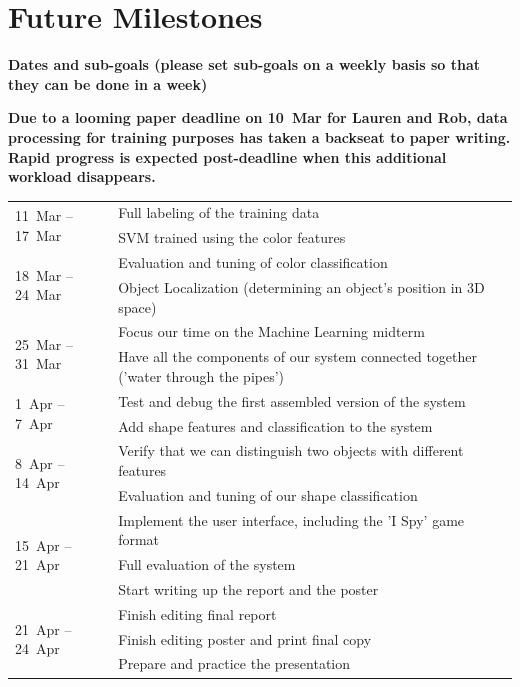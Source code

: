 \documentclass[11pt]{article}
\newcommand{\xxx}[1]{{\bf \color{red} #1}}
\newcommand{\meh}[1]{{\bf \color{blue} #1}}
\newcommand\T{\rule{0pt}{3ex}}
\newcommand\B{\rule[-1.2ex]{0pt}{0pt}}
\begin{document}
\section{Future Milestones}
\xxx{Dates and sub-goals (please set sub-goals on a weekly basis so that they
    can be done in a week)}

\meh{Due to a looming paper deadline on 10~Mar for Lauren and Rob, data
    processing for training purposes has taken a backseat to paper writing.
    Rapid progress is expected post-deadline when this additional workload
    disappears.}

\begin{center}
    \begin{tabular}{ | l | l |}
    \hline
    \multirow{2}{*}{11~Mar -- 17~Mar}
	& Full labeling of the training data \T \\
	& SVM trained using the color features \B \\
    \hline
    \multirow{2}{*}{18~Mar -- 24~Mar}
	& Evaluation and tuning of color classification \T \\
	& Object Localization (determining an object's position in 3D space) \B \\
    \hline
    \multirow{2}{*}{25~Mar -- 31~Mar}
	& Focus our time on the Machine Learning midterm \T\\
	& Have all the components of our system connected together ('water through the pipes') \B \\
    \hline
    \multirow{2}{*}{1~Apr -- 7~Apr}
	& Test and debug the first assembled version of the system \T \\
	& Add shape features and classification to the system \B\\
    \hline
    \multirow{2}{*}{8~Apr -- 14~Apr}
	& Verify that we can distinguish two objects with different features \T\\
	& Evaluation and tuning of our shape classification \B \\
    \hline
    \multirow{3}{*}{15~Apr -- 21~Apr}
	& Implement the user interface, including the 'I Spy' game format \T\\
	& Full evaluation of the system \\
	& Start writing up the report and the poster \B \\
    \hline
    \multirow{3}{*}{21~Apr -- 24~Apr}
	& Finish editing final report \T \\
	& Finish editing poster and print final copy \\
	& Prepare and practice the presentation \B \\
    \hline
    \end{tabular}
\end{center}
\end{document}

